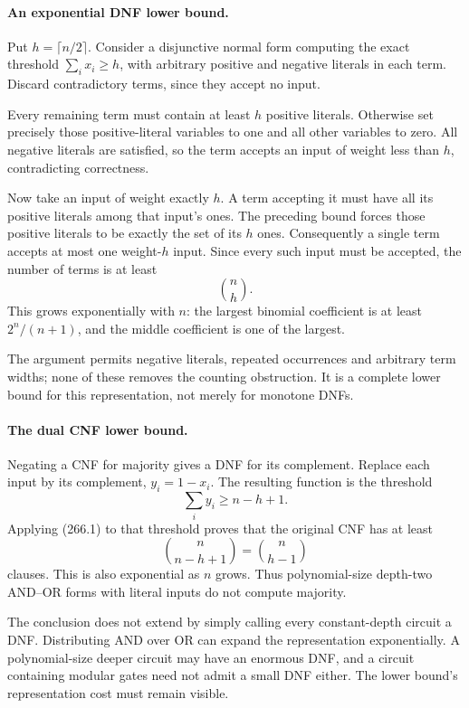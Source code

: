 \documentclass[11pt]{article}
\begin{document}
\paragraph{An exponential DNF lower bound.}
Put $h=\lceil n/2\rceil$. Consider a disjunctive normal form computing the exact threshold $\sum_i x_i\ge h$, with arbitrary positive and negative literals in each term. Discard contradictory terms, since they accept no input.

Every remaining term must contain at least $h$ positive literals. Otherwise set precisely those positive-literal variables to one and all other variables to zero. All negative literals are satisfied, so the term accepts an input of weight less than $h$, contradicting correctness.

Now take an input of weight exactly $h$. A term accepting it must have all its positive literals among that input's ones. The preceding bound forces those positive literals to be exactly the set of its $h$ ones. Consequently a single term accepts at most one weight-$h$ input. Since every such input must be accepted, the number of terms is at least
\[
 \binom nh.
 \tag{266.1}
\]
This grows exponentially with $n$: the largest binomial coefficient is at least $2^n/(n+1)$, and the middle coefficient is one of the largest.

The argument permits negative literals, repeated occurrences and arbitrary term widths; none of these removes the counting obstruction. It is a complete lower bound for this representation, not merely for monotone DNFs.

\paragraph{The dual CNF lower bound.}
Negating a CNF for majority gives a DNF for its complement. Replace each input by its complement, $y_i=1-x_i$. The resulting function is the threshold
\[
 \sum_i y_i\ge n-h+1.
\]
Applying (266.1) to that threshold proves that the original CNF has at least
\[
 \binom n{n-h+1}=\binom n{h-1}
\]
clauses. This is also exponential as $n$ grows. Thus polynomial-size depth-two AND--OR forms with literal inputs do not compute majority.

The conclusion does not extend by simply calling every constant-depth circuit a DNF. Distributing AND over OR can expand the representation exponentially. A polynomial-size deeper circuit may have an enormous DNF, and a circuit containing modular gates need not admit a small DNF either. The lower bound's representation cost must remain visible.
\end{document}
